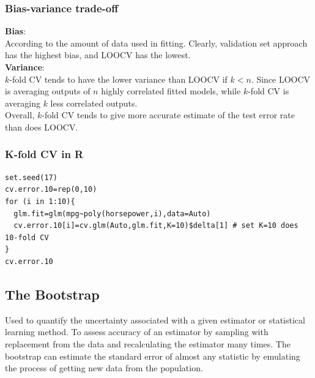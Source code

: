 \documentclass[11pt]{article}
\begin{document}
\subsubsection{Bias-variance trade-off}
\noindent \textbf{Bias}: \\
\noindent According to the amount of data used in fitting. Clearly, validation set approach has the highest bias, and LOOCV has the lowest. \\

\noindent \textbf{Variance}: \\
\noindent $k$-fold CV tends to have the lower variance than LOOCV if $k < n$. Since LOOCV is averaging outputs of $n$ highly correlated fitted models, while $k$-fold CV is averaging $k$ less correlated outputs. \\

\noindent Overall, $k$-fold CV tends to give more accurate estimate of the test error rate than does LOOCV.

\subsubsection{K-fold CV in R}
\begin{lstlisting}
set.seed(17)
cv.error.10=rep(0,10)
for (i in 1:10){
  glm.fit=glm(mpg~poly(horsepower,i),data=Auto)
  cv.error.10[i]=cv.glm(Auto,glm.fit,K=10)$delta[1] # set K=10 does 10-fold CV 
}
cv.error.10
\end{lstlisting}

\subsection{The Bootstrap}
\noindent Used to quantify the uncertainty associated with a given estimator or statistical learning method. To assess accuracy of an estimator by sampling with replacement from the data and recalculating the estimator many times. The bootstrap can estimate the standard error of almost any statistic by emulating the process of getting new data from the population.
\end{document}
